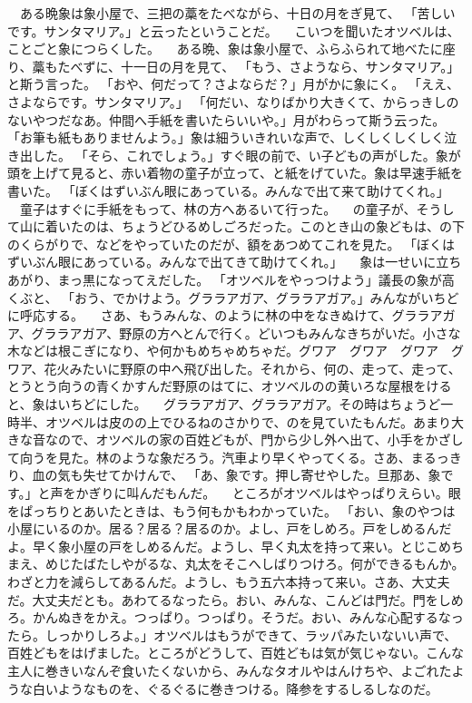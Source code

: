 \documentclass[a5paper, twocolumn]{tbook}
\begin{document}
　ある晩象は象小屋で、三把の藁をたべながら、十日の月をぎ見て、
「苦しいです。サンタマリア。」と云ったということだ。
　こいつを聞いたオツベルは、ことごと象につらくした。
　ある晩、象は象小屋で、ふらふられて地べたに座り、藁もたべずに、十一日の月を見て、
「もう、さようなら、サンタマリア。」と斯う言った。
「おや、何だって？{}さよならだ？」月がかに象にく。
「ええ、さよならです。サンタマリア。」
「何だい、なりばかり大きくて、からっきしのないやつだなあ。仲間へ手紙を書いたらいいや。」月がわらって斯う云った。
「お筆も紙もありませんよう。」象は細ういきれいな声で、しくしくしくしく泣き出した。
「そら、これでしょう。」すぐ眼の前で、い子どもの声がした。象が頭を上げて見ると、赤い着物の童子が立って、と紙をげていた。象は早速手紙を書いた。
「ぼくはずいぶん眼にあっている。みんなで出て来て助けてくれ。」
　童子はすぐに手紙をもって、林の方へあるいて行った。
　の童子が、そうして山に着いたのは、ちょうどひるめしごろだった。このとき山の象どもは、の下のくらがりで、などをやっていたのだが、額をあつめてこれを見た。
「ぼくはずいぶん眼にあっている。みんなで出てきて助けてくれ。」
　象は一せいに立ちあがり、まっ黒になってえだした。
「オツベルをやっつけよう」議長の象が高くぶと、
「おう、でかけよう。グララアガア、グララアガア。」みんながいちどに呼応する。
　さあ、もうみんな、のように林の中をなきぬけて、グララアガア、グララアガア、野原の方へとんで行く。どいつもみんなきちがいだ。小さな木などは根こぎになり、や何かもめちゃめちゃだ。グワア　グワア　グワア　グワア、花火みたいに野原の中へ飛び出した。それから、何の、走って、走って、とうとう向うの青くかすんだ野原のはてに、オツベルのの黄いろな屋根をけると、象はいちどにした。
　グララアガア、グララアガア。その時はちょうど一時半、オツベルは皮のの上でひるねのさかりで、のを見ていたもんだ。あまり大きな音なので、オツベルの家の百姓どもが、門から少し外へ出て、小手をかざして向うを見た。林のような象だろう。汽車より早くやってくる。さあ、まるっきり、血の気も失せてかけんで、
「あ、象です。押し寄せやした。旦那あ、象です。」と声をかぎりに叫んだもんだ。
　ところがオツベルはやっぱりえらい。眼をぱっちりとあいたときは、もう何もかもわかっていた。
「おい、象のやつは小屋にいるのか。居る？{}居る？{}居るのか。よし、戸をしめろ。戸をしめるんだよ。早く象小屋の戸をしめるんだ。ようし、早く丸太を持って来い。とじこめちまえ、めじたばたしやがるな、丸太をそこへしばりつけろ。何ができるもんか。わざと力を減らしてあるんだ。ようし、もう五六本持って来い。さあ、大丈夫だ。大丈夫だとも。あわてるなったら。おい、みんな、こんどは門だ。門をしめろ。かんぬきをかえ。つっぱり。つっぱり。そうだ。おい、みんな心配するなったら。しっかりしろよ。」オツベルはもうができて、ラッパみたいないい声で、百姓どもをはげました。ところがどうして、百姓どもは気が気じゃない。こんな主人に巻きいなんぞ食いたくないから、みんなタオルやはんけちや、よごれたような白いようなものを、ぐるぐるに巻きつける。降参をするしるしなのだ。
\end{document}
